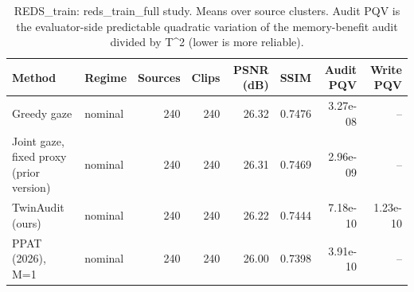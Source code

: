 \begin{table}[t]
\centering
\caption{REDS\_train: reds\_train\_full study. Means over source clusters. Audit PQV is the evaluator-side predictable quadratic variation of the memory-benefit audit divided by T^2 (lower is more reliable).}
\label{tab:reds_train_full_REDS_train}
\small
\begin{tabular}{llrrrrrr}
\toprule
Method & Regime & Sources & Clips & PSNR (dB) & SSIM & Audit PQV & Write PQV \\
\midrule
Greedy gaze & nominal & 240 & 240 & 26.32 & 0.7476 & 3.27e-08 & -- \\
Joint gaze, fixed proxy (prior version) & nominal & 240 & 240 & 26.31 & 0.7469 & 2.96e-09 & -- \\
TwinAudit (ours) & nominal & 240 & 240 & 26.22 & 0.7444 & 7.18e-10 & 1.23e-10 \\
PPAT (2026), M=1 & nominal & 240 & 240 & 26.00 & 0.7398 & 3.91e-10 & -- \\
\bottomrule
\end{tabular}
\end{table}
